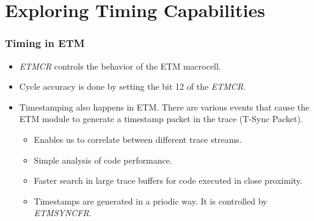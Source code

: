 \documentclass{beamer}
\begin{document}
\section{Exploring Timing Capabilities}
\begin{frame}
    \frametitle{Timing in ETM}
    \begin{itemize}
        \item \textit{ETMCR} controls the behavior of the ETM macrocell.
        \item Cycle accuracy is done by setting the bit 12 of the \textit{ETMCR}.
        \item Timestamping also happens in ETM. There are various events that
            cause the ETM module to generate a timestamp packet in the trace
            (T-Sync Packet).
            \begin{itemize}
                \item Enables us to correlate between different trace streams.
                \item Simple analysis of code performance.
                \item Faster search in large trace buffers for code executed
                    in close proximity.
                \item Timestamps are generated in a priodic way.
                    It is controlled by \textit{ETMSYNCFR}.
            \end{itemize}
    \end{itemize}
\end{frame}
\end{document}
